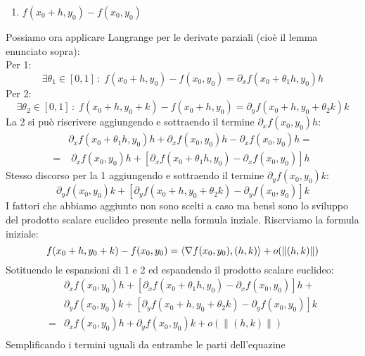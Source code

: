 {\begin{enumerate}
		\item $f(x_0 + h, y_0) - f(x_0, y_0)$
	\end{enumerate}
	Possiamo ora applicare Langrange per le derivate parziali (cioè il 
	lemma enunciato sopra):\\
	Per 1:
	\begin{equation*}
		\exists \theta_1 \in [0, 1] \, : \; f(x_0 + h, y_0) - 
		f(x_0, y_0) = \partial_x f(x_0 + \theta_1 h, y_0)h
	\end{equation*}
	Per 2:
	\begin{equation*}
		\exists \theta_2 \in [0, 1] \, : \; f(x_0 + h, y_0 + k) - 
		f(x_0 + h, y_0) = \partial_y f(x_0 + h, y_0 + \theta_2 k)k
	\end{equation*}
	La 2 si può riscrivere aggiungendo e sottraendo il termine $\partial_x 
	f(x_0, y_0) h$:
	\begin{align*}
		&\partial_x f(x_0 + \theta_1 h, y_0)h + \partial_x f(x_0, y_0) 
		h - \partial_x f(x_0, y_0) h =\\[5pt]
		= &\; \partial_x f(x_0, y_0) h + [\partial_x f(x_0 + \theta_1 
		h, y_0) - \partial_x f(x_0, y_0) ]h
	\end{align*}
	Stesso discorso per la 1 aggiungendo e sottraendo il termine 
	$\partial_y f(x_0, y_0) k$:
	\begin{equation*}
		\partial_y f(x_0, y_0) k + [\partial_y f(x_0 + h, y_0 + 
		\theta_2 k) - \partial_y f(x_0, y_0)]k
	\end{equation*}
	I fattori che abbiamo aggiunto non sono scelti a caso ma bensì sono lo 
	sviluppo del prodotto scalare euclideo presente nella formula inziale. 
	Riscrviamo la formula iniziale:
	\begin{equation*}
		f(x_0 + h, y_0 + k) - f(x_0, y_0) = \langle \nabla f(x_0, y_0), 
		(h, k) \rangle + o(\lVert (h, k) \rVert)\\
	\end{equation*}
	Sotituendo le espansioni di 1 e 2 ed espandendo il prodotto scalare 
	euclideo:
	\begin{align*}
		&\partial_x f(x_0, y_0) h + [\partial_x f(x_0 + \theta_1 h, y_0) 
		- \partial_x f(x_0, y_0) ]h +\\[2pt]
		&\partial_y f(x_0, y_0) k + [\partial_y f(x_0 + h, y_0 + 
		\theta_2 k) - \partial_y f(x_0, y_0)]k \\[2pt]
		=& \partial_x f(x_0, y_0) h + \partial_y f(x_0, y_0) k + 
		o(\lVert (h, k) \rVert)\\
	\end{align*}
	Semplificando i termini uguali da entrambe le parti dell'equazine 
}
